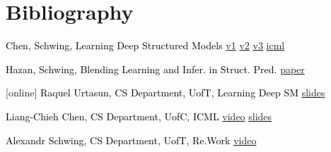 \documentclass{beamer}
\begin{document}
\section*{Bibliography}
\begin{frame}
	\begin{thebibliography}{10}
		\beamertemplatebookbibitems
		
			\textcolor{black}{Chen, Schwing, Learning Deep Structured Models} \href{arxiv.org/pdf/1407.2538v1.pdf}{v1} \href{arxiv.org/pdf/1407.2538v2.pdf}{v2} \href{arxiv.org/pdf/1407.2538v3.pdf}{v3} \href{http://www.cs.toronto.edu/~urtasun/publications/chen_etal_icml15.pdf}{icml}
		
			\textcolor{black}{Hazan, Schwing, Blending Learning and Infer. in Struct. Pred.} \href{http://arxiv.org/pdf/1210.2346v2.pdf}{paper}
				
		[online]
			\textcolor{black}{Raquel Urtasun, CS Department, UofT, Learning Deep SM} \href{http://www.cs.toronto.edu/~urtasun/deep_structured_sports_small.pdf}{slides}
		
			\textcolor{black}{Liang-Chieh Chen, CS Department, UofC, ICML} \href{http://videolectures.net/icml2015_chen_deep_structured_models}{video}  \href{http://videolectures.net/site/normal_dl/tag=1004999/icml2015_chen_deep_structured_models_01.pdf}{slides}
		
			\textcolor{black}{Alexandr Schwing, CS Department, UofT, Re.Work} \href{https://youtu.be/barVVAmXQPQ}{video}
	\end{thebibliography}
\end{frame}
\end{document}
